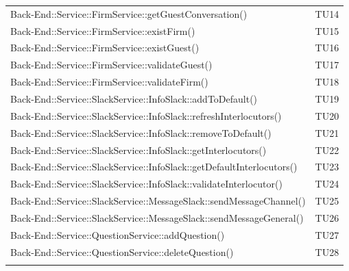 \documentclass[../PianoDiQualifica_v3.0.0.tex]{subfiles}
\begin{document}
\begin{longtable}[c] {>{\centering\arraybackslash}p{} >{\centering\arraybackslash}p{}}
 			\addlinespace[0.3em]
			\midrule
			\addlinespace[0.3em]
 			Back-End::Service::FirmService::getGuestConversation() & TU14 \\
 			\addlinespace[0.3em]
			\midrule
			\addlinespace[0.3em]
			Back-End::Service::FirmService::existFirm() & TU15 \\
			\addlinespace[0.3em]
			\midrule
			\addlinespace[0.3em]
			Back-End::Service::FirmService::existGuest() & TU16 \\
 			\addlinespace[0.3em]
			\midrule
			\addlinespace[0.3em]
			Back-End::Service::FirmService::validateGuest() & TU17 \\
 			\addlinespace[0.3em]
			\midrule
			\addlinespace[0.3em]
 			Back-End::Service::FirmService::validateFirm() & TU18 \\
 			\addlinespace[0.3em]
			\midrule
			\addlinespace[0.3em]
 			Back-End::Service::SlackService::InfoSlack::addToDefault() & TU19 \\
 			\addlinespace[0.3em]
			\midrule
			\addlinespace[0.3em]
			Back-End::Service::SlackService::InfoSlack::refreshInterlocutors() & TU20 \\
			\addlinespace[0.3em]
			\midrule
			\addlinespace[0.3em]
 			Back-End::Service::SlackService::InfoSlack::removeToDefault() & TU21 \\
 			\addlinespace[0.3em]
			\midrule
			\addlinespace[0.3em]
			Back-End::Service::SlackService::InfoSlack::getInterlocutors() & TU22 \\
 			\addlinespace[0.3em]
			\midrule
			\addlinespace[0.3em]
 			Back-End::Service::SlackService::InfoSlack::getDefaultInterlocutors() & TU23 \\
 			\addlinespace[0.3em]
			\midrule
			\addlinespace[0.3em]
			Back-End::Service::SlackService::InfoSlack::validateInterlocutor() & TU24 \\
 			\addlinespace[0.3em]
			\midrule
			\addlinespace[0.3em]
			Back-End::Service::SlackService::MessageSlack::sendMessageChannel() & TU25 \\
 			\addlinespace[0.3em]
			\midrule
			\addlinespace[0.3em]
 			Back-End::Service::SlackService::MessageSlack::sendMessageGeneral() & TU26 \\
 			\addlinespace[0.3em]
			\midrule
			\addlinespace[0.3em]
 			Back-End::Service::QuestionService::addQuestion() & TU27 \\
 			\addlinespace[0.3em]
			\midrule
			\addlinespace[0.3em]
 			Back-End::Service::QuestionService::deleteQuestion() & TU28 \\
 			\addlinespace[0.3em]

\end{longtable}
\end{document}
